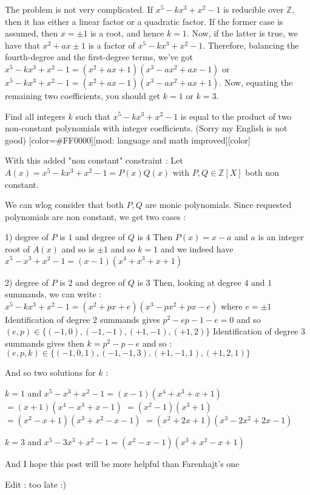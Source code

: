 \begin{solution}
	The problem is not very complicated.  If $x^5-kx^3+x^2-1$ is reducible over $\mathbb{Z}$, then it has either a linear factor or a quadratic factor.  If the former case is assumed, then $x=\pm 1$ is a root, and hence $k=1$.  Now, if the latter is true, we have that $x^2+ax \pm 1$ is a factor of $x^5-kx^3+x^2-1$.  Therefore, balancing the fourth-degree and the first-degree terms, we've got $x^5-kx^3+x^2-1 = \left(x^2+ax + 1\right)\left(x^3-ax^2 +ax-1\right)$ or $x^5-kx^3+x^2-1 = \left(x^2+ax-1\right)\left(x^3-ax^2+ax+1\right)$.  Now, equating the remaining two coefficients, you should get $k=1$ or $k=3$.
\end{solution}



\begin{solution}
	\begin{tcolorbox}Find all integers $k$ such that $x^5-kx^3+x^2-1$ is equal to the product of two non-constant polynomials with integer coefficients.
(Sorry my English is not good) [color=#FF0000][mod: language and math improved][\/color]\end{tcolorbox}
With this added "non constant" constraint : 
Let $A(x)=x^5-kx^3+x^2-1=P(x)Q(x)$ with $P,Q\in\mathbb Z[X]$ both non constant.

We can wlog consider that both $P,Q$ are monic polynomials.
Since requested polynomials are non constant, we get two cases :

1) degree of $P$ is $1$ and degree of $Q$ is $4$
Then $P(x)=x-a$ and $a$ is an integer root of $A(x)$ and so is $\pm 1$ and so $k=1$ and we indeed have 
$x^5-x^3+x^2-1=(x-1)(x^4+x^3+x+1)$

2) degree of $P$ is $2$ and degree of $Q$ is $3$
Then, looking at degree $4$ and $1$ summands, we can write :
$x^5-kx^3+x^2-1=(x^2+px+e)(x^3-px^2+px-e)$ where $e=\pm 1$
Identification of degree $2$ summands gives $p^2-ep-1-e=0$ and so $(e,p)\in\{(-1,0),(-1,-1),(+1,-1),(+1,2)\}$
Identification of degree $3$ summands gives then $k=p^2-p-e$ and so :
$(e,p,k)\in\{(-1,0,1),(-1,-1,3),(+1,-1,1),(+1,2,1)\}$

And so two solutions for $k$ :

$\boxed{k=1}$ and $x^5-x^3+x^2-1=(x-1)(x^4+x^3+x+1)$ $=(x+1)(x^4-x^3+x-1)$ $=(x^2-1)(x^3+1)$ $=(x^2-x+1)(x^3+x^2-x-1)$ $=(x^2+2x+1)(x^3-2x^2+2x-1)$

$\boxed{k=3}$ and $x^5-3x^3+x^2-1=(x^2-x-1)(x^3+x^2-x+1)$

And I hope this post will be more helpful than Farenhajt's one

Edit : too late :)
\end{solution}



